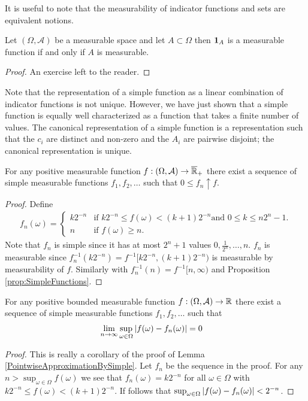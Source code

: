 It is useful to note that the measurability of indicator functions and sets are equivalent notions.
\begin{cor}\label{MeasurabilityOfCharacteristicFunctions}Let $(\Omega, \mathcal{A})$ be a measurable space and let $A  \subset \Omega$
then $\textbf{1}_{A}$ is a measurable function if and only if $A$ is measurable.
\end{cor}
\begin{proof}
An exercise left to the reader.
\end{proof}

Note that the representation of a simple function as a linear
combination of indicator functions is not unique.  However, we
have
just shown that a simple function is equally well characterized as a
function that takes a finite number of values.  The canonical
representation of a simple function is a representation such that the
$c_i$ are distinct and non-zero and the $A_i$ are pairwise disjoint; the canonical
representation is unique.
\begin{lem}\label{PointwiseApproximationBySimple}For any positive measurable function $f : (\Omega,
  \mathcal{A}) \to \overline{\mathbb{R}}_+$ there exist a sequence of simple measurable
  functions $f_1, f_2, \dots$ such that $0 \leq f_n \uparrow f$.
\end{lem}
\begin{proof}
Define
\begin{align*}
f_n(\omega) = 
\begin{cases}k2^{-n} & \text{if $k2^{-n} \leq f(\omega) < (k+1)2^{-n}$
    and $0 \leq k \leq n2^n -1$.} \\
n & \text{if $f(\omega) \geq n$.}
\end{cases}
\end{align*}
Note that $f_n$ is simple since it has at most $2^n + 1$ values $0,
\frac{1}{2^n}, \dots, n$.  $f_n$ is measurable since
$f_n^{-1}(k2^{-n}) = f^{-1}[k2^{-n},(k+1)2^{-n})$ is measurable by measurability of $f$.  Similarly
with $f_n^{-1}(n) = f^{-1} [n,\infty)$ and Proposition \ref{prop:SimpleFunctions}.
\end{proof}

\begin{cor}\label{UniformApproximationOfBoundedBySimple}For any
  positive bounded measurable function $f : (\Omega,
  \mathcal{A}) \to \mathbb{R}$ there exist a sequence of simple measurable
  functions $f_1, f_2, \dots$ such that
  \begin{align*}
    \lim_{n \to \infty}
    \sup_{\omega \in \Omega} \left \vert f(\omega) - f_n(\omega) \right \vert &= 0
  \end{align*}
\end{cor}
\begin{proof}
This is really a corollary of the proof of Lemma
\ref{PointwiseApproximationBySimple}.   Let $f_n$ be the sequence
in the proof.  For any $n > \sup_{\omega \in \Omega} f(\omega)$ we see
that $f_n(\omega) = k 2^{-n}$ for all $\omega \in \Omega$ with
$k2^{-n} \leq f(\omega) < (k+1)2^{-n}$.   If follows that
$\sup_{\omega \in \Omega} \left \vert f(\omega) - f_n(\omega) \right \vert < 2^{-n}$.
\end{proof}

